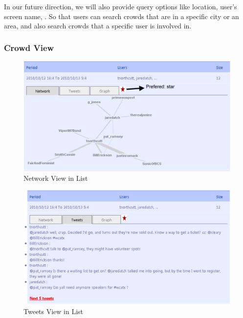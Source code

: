 \documentclass{sig-alternate}
\begin{document}
In our future direction, we will also provide query options like location, user's
screen name, . So that users can search crowds that are in a specific city or an 
area, and also search crowds that a specific user is involved in.

\subsubsection{Crowd View}

\begin{figure}
\centering
\includegraphics[width=\linewidth]{imgs/NetworkInList.png}
\caption{Network View in List}
\label{fig:NetworkInList}
\end{figure}

\begin{figure}
\centering
\includegraphics[width=\linewidth]{imgs/TweetsInList.png}
\caption{Tweets View in List}
\label{fig:TweetInList}
\end{figure}
\end{document}
